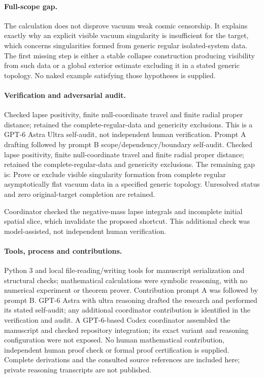 \documentclass[11pt]{article}
\begin{document}
\paragraph{Full-scope gap.} The calculation does not disprove vacuum weak cosmic censorship. It explains exactly why an explicit visible vacuum singularity is insufficient for the target, which concerns singularities formed from generic regular isolated-system data. The first missing step is either a stable collapse construction producing visibility from such data or a global exterior estimate excluding it in a stated generic topology. No naked example satisfying those hypotheses is supplied.

\paragraph{Verification and adversarial audit.}
Checked lapse positivity, finite null-coordinate travel and finite radial proper distance; retained the complete-regular-data and genericity exclusions. This is a GPT-6 Astra Ultra self-audit, not independent human verification. Prompt A drafting followed by prompt B scope/dependency/boundary self-audit. Checked lapse positivity, finite null-coordinate travel and finite radial proper distance; retained the complete-regular-data and genericity exclusions. The remaining gap is: Prove or exclude visible singularity formation from complete regular asymptotically flat vacuum data in a specified generic topology. Unresolved status and zero original-target completion are retained.

Coordinator checked the negative-mass lapse integrals and incomplete initial spatial slice, which invalidate the proposed shortcut. This additional check was model-assisted, not independent human verification.

\paragraph{Tools, process and contributions.}
Python 3 and local file-reading/writing tools for manuscript serialization and structural checks; mathematical calculations were symbolic reasoning, with no numerical experiment or theorem prover. Contribution prompt A was followed by prompt B. GPT-6 Astra with ultra reasoning drafted the research and performed its stated self-audit; any additional coordinator contribution is identified in the verification and audit. A GPT-6-based Codex coordinator assembled the manuscript and checked repository integration; its exact variant and reasoning configuration were not exposed. No human mathematical contribution, independent human proof check or formal proof certification is supplied. Complete derivations and the consulted source references are included here; private reasoning transcripts are not published.
\end{document}
